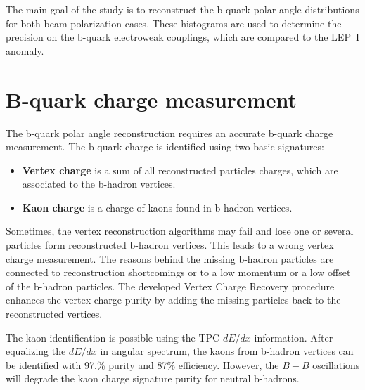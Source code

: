 \documentclass[a0,portrait]{a0poster}
\begin{document}
\begin{multicols}{2}
The main goal of the study is to reconstruct the b-quark polar angle distributions for both beam polarization cases. 
These histograms are used to determine the precision on the b-quark electroweak couplings, which are compared to the LEP~I anomaly. 


\color{DarkSlateGray} %

\section*{B-quark charge measurement}
{\color{Blue}
The b-quark polar angle reconstruction requires an accurate b-quark charge measurement. 
The b-quark charge is identified using two basic signatures:
\begin{itemize}
	\item \textbf{Vertex charge} is a sum of all reconstructed particles charges, which are associated to the b-hadron vertices. 
	\item \textbf{Kaon charge} is a charge of kaons found in b-hadron vertices. 
\end{itemize}
}

Sometimes, the vertex reconstruction algorithms may fail and lose one or several particles form reconstructed b-hadron vertices. This leads to a wrong vertex charge measurement. 
The reasons behind the missing b-hadron particles are connected to reconstruction shortcomings or to a low momentum or a low offset of the b-hadron particles. 
The developed Vertex Charge Recovery procedure enhances the vertex charge purity by adding the missing particles back to the reconstructed vertices. 


The kaon identification is possible using the TPC $dE/dx$ information. After equalizing the $dE/dx$ in angular spectrum, the kaons from b-hadron vertices can be identified with 97.\% purity and 87\% efficiency. However, the $B-\bar{B}$ oscillations will degrade the kaon charge signature purity for neutral b-hadrons.


\end{multicols}
\end{document}
